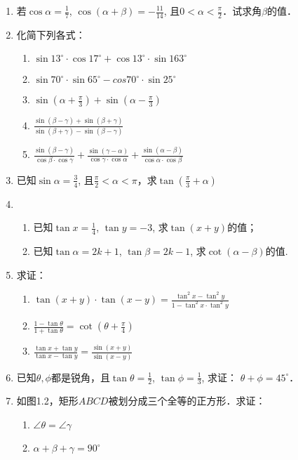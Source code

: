 \begin{enumerate}
\item 若$\cos\alpha=\frac{1}{7}$, $\cos(\alpha+\beta)=-\frac{11}{14}$, 且$0<\alpha<\frac{\pi}{2}$．试求角$\beta$的值．

\item 化简下列各式：
\begin{enumerate}
    \item $\sin13^{\circ}\cdot\cos17^{\circ}+\cos13^{\circ}\cdot \sin163^{\circ}$
    \item $\sin70^{\circ}\cdot\sin65^{\circ}-cos70^{\circ}\cdot\sin25^{\circ}$
    \item $\sin\left(\alpha+\frac{\pi}{3}\right)+\sin\left(\alpha-\frac{\pi}{3}\right)$
    \item $\frac{\sin(\beta-\gamma)+\sin(\beta+\gamma)}{\sin(\beta+\gamma)-\sin(\beta-\gamma)}$
    \item $\frac{\sin(\beta-\gamma)}{\cos\beta\cdot \cos\gamma}+\frac{\sin(\gamma-\alpha)}{\cos\gamma\cdot \cos\alpha}+\frac{\sin(\alpha-\beta)}{\cos\alpha\cdot \cos\beta}$
\end{enumerate}

\item 已知$\sin\alpha=\frac{3}{4}$, 且$\frac{\pi}{2}<\alpha<\pi$，求$\tan\left(\frac{\pi}{3}+\alpha\right)$
\item \begin{enumerate}
    \item 已知$\tan x=\frac{1}{4}$, $\tan y=-3$, 求$\tan(x+y)$的值；
    \item 已知$\tan \alpha=2k+1$, $\tan\beta=2k-1$, 求$\cot(\alpha-\beta)$的值.
\end{enumerate}

\item 求证：
\begin{enumerate}
    \item $\tan(x+y)\cdot \tan(x-y)=\frac{\tan^2 x-\tan^2 y}{1-\tan^2 x\cdot \tan^2 y}$
    \item $\frac{1-\tan\theta}{1+\tan\theta}=\cot\left(\theta+\frac{\pi}{4}\right)$
\item $\frac{\tan x+\tan y}{\tan x-\tan y}=\frac{\sin(x+y)}{\sin(x-y)}$
\end{enumerate}

\item 已知$\theta, \phi$都是锐角，且$\tan \theta=\frac{1}{2}$, $\tan\phi=\frac{1}{3}$, 求证：
$\theta+\phi=45^{\circ}$．

\item 如图1.2，矩形$ABCD$被划分成三个全等的正方形．求证：
\begin{enumerate}
    \item $\angle \theta=\angle \gamma$
    \item $\alpha+\beta+\gamma=90^{\circ}$
\end{enumerate}


\end{enumerate}
